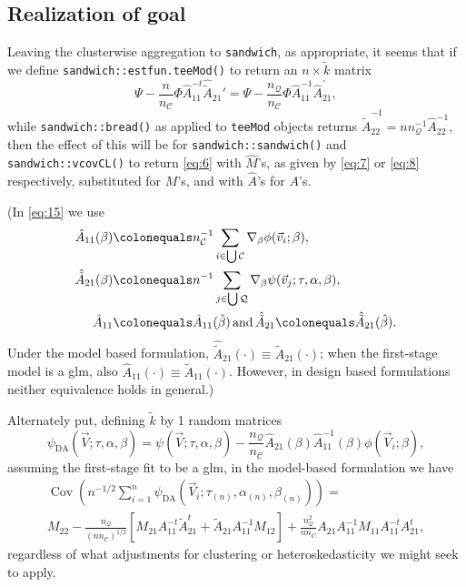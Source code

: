\documentclass{article}
\newcommand{\defeq}{\ensuremath{\colonequals}}
\begin{document}
\subsection{Realization of goal} \label{sec:realization-goal}
Leaving the clusterwise aggregation to \texttt{sandwich}, as
appropriate, it seems that if we define
\texttt{sandwich::estfun.teeMod()} to return an $n \times \tilde{k}$ matrix
\begin{equation} \label{eq:15}
  \Psi -
  \frac{n}{n_{\mathcal{C}}}\Phi
  \hat{A}_{11}^{-t}\hat{\tilde{A}}_{21}' = \Psi -
 \frac{n_{\mathcal{Q}}}{n_{\mathcal{C}}}\Phi
 \hat{A}_{11}^{-1}\hat{A}_{21}^{\prime},
\end{equation}
while \texttt{sandwich::bread()} as applied to
\texttt{teeMod} objects returns $\hat{\tilde{A}}_{22}^{-1} = nn_{\mathcal{Q}}^{-1}\hat{A}_{22}^{-1}$, then the effect of this will be for \texttt{sandwich::sandwich()}
and \texttt{sandwich::vcovCL()} to return \eqref{eq:6} with
$\hat{M}$'s,  as
given by \eqref{eq:7} or \eqref{eq:8} respectively, substituted for
$M$'s, and with $\hat{A}$'s for $A$'s.

(In \eqref{eq:15}
we use
\begin{align*}
  \hat{A}_{11}(\beta) &\defeq  n_{\mathcal{C}}^{-1}\sum_{i\in \bigcup
        \mathcal{C}}\nabla_{\beta}\phi(\vec{v}_{i};
        \beta ),\\
  \hat{\tilde{A}}_{21}(\beta) &\defeq n^{-1}\sum_{j\in \bigcup
        \mathcal{Q}}\nabla_{\beta}\psi(\vec{v}_{j};
        \tau, \alpha, \beta ),\\
  \hat{A}_{11}&\defeq \hat{A}_{11}(\hat\beta)\, \text{and}\, \hat{\tilde{A}}_{21}\defeq \hat{\tilde{A}}_{21}(\hat\beta).
\end{align*}
Under the model based
formulation, $\hat{\tilde{A}}_{21}(\cdot) \equiv \tilde{A}_{21}(\cdot)$; when the
first-stage model is a glm, also $\hat{A}_{11}(\cdot) \equiv
\tilde{A}_{11}(\cdot)$.  However, in design based formulations neither
equivalence holds in general.)

Alternately put,
defining $\tilde{k}$ by 1 random matrices 
\begin{equation}\label{eq:10}
    \psi_\text{DA}(\vec{V}; \tau, \alpha, 
    \beta) = \psi (\vec{V}; \tau,\alpha, 
    \beta) -
    \frac{n_{\mathcal{Q}}}{n_{\mathcal{C}}}
    \hat{{A}}_{21}(\beta) \hat{A}_{11}^{-1}(\beta)\phi(\vec{V}_{i};
    \beta), 
\end{equation}
assuming the first-stage fit to be a glm, in the model-based formulation we have
\begin{multline}
  \operatorname{Cov}\left(n^{-1/2}\sum_{i=1}^{n} \psi_\text{DA}(\vec{V}_{i}; \tau_{(n)},\alpha_{(n)},
    \beta_{(n)})\right) = \\
  M_{22} -
                                 \frac{n_{\mathcal{Q}}}{(n n_{\mathcal{C}})^{1/2}}[M_{21}A_{11}^{-t}\tilde{A}_{21}^t
                                 + \tilde{A}_{21}A_{11}^{-1}M_{12}] +
                                 \frac{n_{\mathcal{Q}}^{2}}{nn_C}{A}_{21}A_{11}^{-1}M_{11}A_{11}^{-t}{A}_{21}^{t}, \label{eq:12}
                               \end{multline}
regardless of what adjustments for
clustering or heteroskedasticity we might seek to apply.
\end{document}
